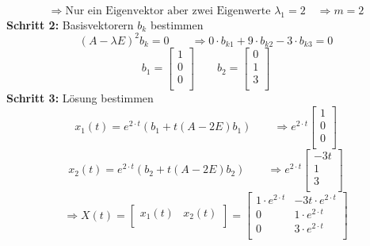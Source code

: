 \begin{equation*}
\Longrightarrow \text{Nur ein Eigenvektor aber zwei Eigenwerte $\lambda_1 = 2$} \quad \Longrightarrow m = 2
\end{equation*}
\textbf{Schritt 2:} Basisvektorern $b_k$ bestimmen \\
\begin{equation*}
(A-\lambda E)^2 b_k = 0 \qquad \Longrightarrow 0\cdot b_{k1} + 9\cdot b_{k2} - 3\cdot b_{k3} = 0
\end{equation*}
\begin{equation*}
b_1= 
\begin{bmatrix} %
	1 \\
	0 \\
	0 \\
\end{bmatrix}
\qquad b_2= 
\begin{bmatrix} %
	0 \\
	1 \\
	3 \\
\end{bmatrix}
\end{equation*}
\textbf{Schritt 3:} Lösung bestimmen\\
\begin{equation*}
x_1(t) = e^{2 \cdot t} (b_1 + t(A -  2 E)b_1) \qquad \Longrightarrow e^{2\cdot t}
\begin{bmatrix} %
	1 \\
	0 \\
	0 \\
\end{bmatrix}
\end{equation*}
\begin{equation*}
x_2(t) = e^{2 \cdot t} (b_2 + t(A -  2  E)b_2) \qquad \Longrightarrow e^{2\cdot t}
\begin{bmatrix} %
	-3t \\
	1 \\
	3 \\
\end{bmatrix}
\end{equation*}
\begin{equation*}
 \Longrightarrow X(t) = 
\begin{bmatrix} %
	 x_1(t) & x_2(t) \\
\end{bmatrix}
=
\begin{bmatrix} %
	1 \cdot e^{2 \cdot t} & -3t \cdot e^{2 \cdot t} \\
	0 & 1\cdot e^{2 \cdot t}  \\
	0 & 3 \cdot e^{2 \cdot t} \\
\end{bmatrix}
\end{equation*}

